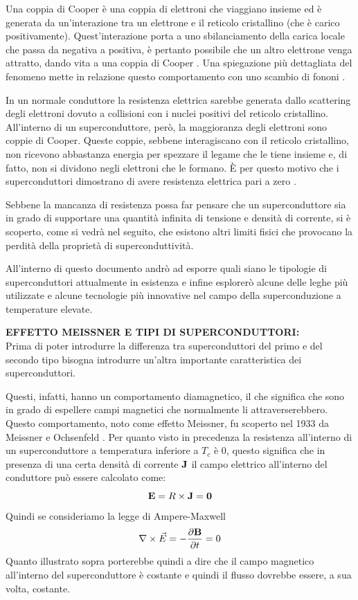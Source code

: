 \documentclass[a4paper,10pt]{article}
\begin{document}
Una coppia di Cooper è una coppia di elettroni che viaggiano insieme ed è generata da
un'interazione tra un elettrone e il reticolo cristallino (che è carico positivamente).
Quest'interazione porta a uno sbilanciamento della carica locale che passa da negativa a positiva, è pertanto possibile che un altro elettrone venga attratto, dando vita a una coppia di
Cooper \cite{cooper-cambridge}. Una spiegazione più dettagliata del fenomeno mette in relazione
questo comportamento con uno scambio di fononi \cite{quantum-springer}.

In un normale conduttore la resistenza elettrica sarebbe generata dallo scattering degli elettroni
dovuto a collisioni con i nuclei positivi del reticolo cristallino. All'interno di un
superconduttore, però, la maggioranza degli elettroni sono coppie di Cooper. Queste coppie, sebbene
interagiscano con il reticolo cristallino, non ricevono abbastanza energia per spezzare il legame
che le tiene insieme e, di fatto, non si dividono negli elettroni che le formano. È per questo motivo che i superconduttori dimostrano di avere resistenza elettrica pari a zero \cite{bcs-cambridge}.

Sebbene la mancanza di resistenza possa far pensare che un superconduttore sia in grado di
supportare una quantità infinita di tensione e densità di corrente, si è scoperto, come si vedrà nel
seguito, che esistono altri limiti fisici che provocano la perdità della proprietà di
superconduttività.

All'interno di questo documento andrò ad esporre quali siano le tipologie di superconduttori
attualmente in esistenza e infine esplorerò alcune delle leghe più utilizzate e alcune tecnologie
più innovative nel campo della superconduzione a temperature elevate.

\bigskip
{}
\label{sec:type-one}
\noindent
\textbf{EFFETTO MEISSNER E TIPI DI SUPERCONDUTTORI:}
\\
Prima di poter introdurre la differenza tra superconduttori del primo e del secondo tipo bisogna
introdurre un'altra importante caratteristica dei superconduttori.

Questi, infatti, hanno un comportamento diamagnetico, il che significa che sono in grado di
espellere campi magnetici che normalmente li attraverserebbero. Questo comportamento, noto come
effetto Meissner, fu scoperto nel 1933 da Meissner e Ochsenfeld \cite{meissner}. Per quanto visto in
precedenza la resistenza all'interno di un superconduttore a temperatura inferiore a $T_c$ è $0$,
questo significa che in presenza di una certa densità di corrente $\mathbf{J}$ il campo elettrico
all'interno del conduttore può essere calcolato come:
\begin{equation}
	\mathbf{E} = R \times \mathbf{J} = \mathbf{0}
\end{equation}
Quindi se consideriamo la legge di Ampere-Maxwell
\begin{equation*}
	\nabla \times \vec{E} = - \frac{\partial{\mathbf{B}}}{\partial{t}} = 0
\end{equation*}
Quanto illustrato sopra porterebbe quindi a dire che il campo magnetico all'interno del
superconduttore è costante e quindi il flusso dovrebbe essere, a sua volta, costante.
\end{document}
